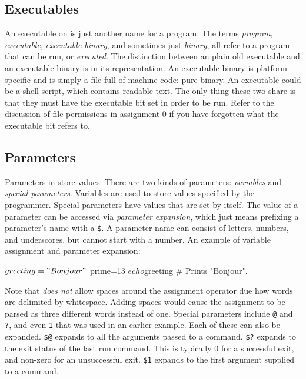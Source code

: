 \subsection{Executables}

An executable on \Unix{} is just another name for a program. The terms
\emph{program}, \emph{executable}, \emph{executable binary}, and sometimes just
\emph{binary}, all refer to a program that can be run, or \emph{executed}. The
distinction between an plain old executable and an executable binary is in its
representation. An executable binary is platform specific and is simply a file
full of machine code: pure binary. An executable could be a shell script, which
contains readable text. The only thing these two share is that they must have
the executable bit set in order to be run. Refer to the discussion of \Unix{}
file permissions in assignment 0 if you have forgotten what the executable bit
refers to.

\subsection{Parameters}

Parameters in \Bash{} store values. There are two kinds of parameters:
\emph{variables} and \emph{special parameters}. Variables are used to store
values specified by the programmer. Special parameters have values that are set
by \Bash{} itself. The value of a parameter can be accessed via \emph{parameter
expansion}, which just means prefixing a parameter's name with a \texttt{\$}. A
parameter name can consist of letters, numbers, and underscores, but cannot
start with a number. An example of \Bash{} variable assignment and parameter
expansion:

\begin{shlisting}{}
$ greeting="Bonjour"
$ prime=13
$ echo $greeting # Prints "Bonjour".
\end{shlisting}

Note that \Bash{} \emph{does not} allow spaces around the assignment operator
due how words are delimited by whitespace. Adding spaces would cause the
assignment to be parsed as three different words instead of one. Special
parameters include \texttt{@} and \texttt{?}, and even \texttt{1} that was used
in an earlier example. Each of these can also be expanded. \texttt{\$@} expands
to all the arguments passed to a command. \texttt{\$?} expands to the exit status
of the last run command. This is typically $0$ for a successful exit, and
non-zero for an unsuccessful exit. \texttt{\$1} expands to the first argument
supplied to a command.

